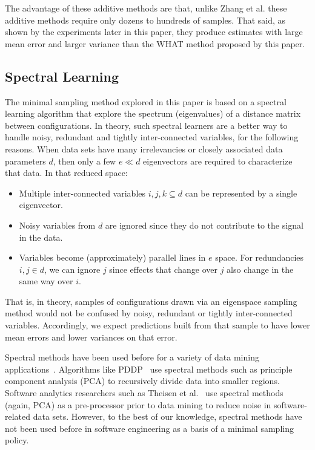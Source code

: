 \documentclass{sig-alternative}
\newcommand{\bi}{\begin{itemize}}%
\newcommand{\ei}{\end{itemize}}
\begin{document}
The advantage of these additive methods are that, unlike  Zhang et al. these additive methods require only dozens to hundreds of samples. That said, as shown by the experiments later in this
paper, they produce estimates with large mean error and larger variance than the WHAT method proposed by
this paper.
 

\subsection{Spectral Learning}\label{sect:spect}

The minimal sampling method explored in this paper is based on a spectral learning algorithm
that  explore the spectrum (eigenvalues) of a distance matrix between  configurations.
In theory, such spectral learners are a better way to handle noisy, redundant and tightly inter-connected variables, for the following reasons.
When data sets have many irrelevancies   or closely associated data parameters $d$, then
only a few $e \ll d$ eigenvectors are required to characterize that data.
In that reduced space:
\bi
\item
Multiple inter-connected variables $i,j,k \subseteq d$ can be represented
by a single eigenvector.
\item
Noisy variables from $d$ are
ignored since they  do not contribute to the signal in the data.
\item
Variables  become (approximately) parallel lines
in $e$ space. For  redundancies \mbox{$i,j \in d$}, we
can ignore $j$
since effects that change over $j$ also
change in the same way over $i$.
\ei
That is, in theory, samples of configurations drawn via an eigenspace sampling method
would not be confused by noisy, redundant or tightly inter-connected variables. Accordingly,
we expect predictions built from that sample to have  lower mean errors and lower variances on that error.

Spectral methods have been used before for a variety of data mining applications~\cite{kamvar2003spectral}.
Algorithms like PDDP~\cite{boley98} use spectral methods such as principle component analysis (PCA) to
recursively divide data into smaller regions.  Software analytics researchers such as Theisen et al.~\cite{Theisen15}  use spectral methods (again, PCA) as a pre-processor prior to data mining  to reduce noise in software-related data sets.
However, to the best of our knowledge, spectral methods have not been used before in software engineering as a basis 
of a minimal sampling policy.
\end{document}
